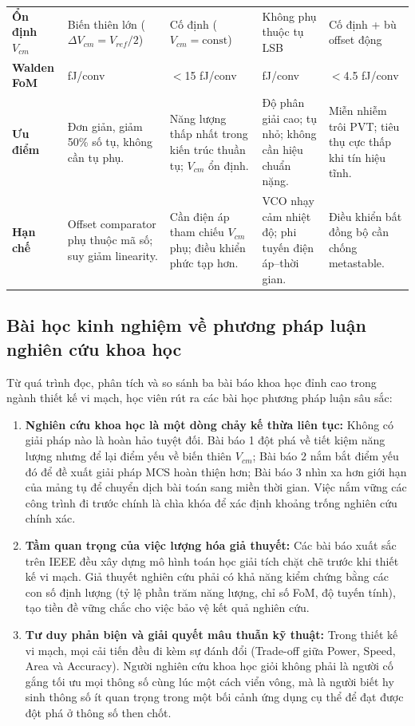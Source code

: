 \documentclass[12pt,a4paper]{article}
\begin{document}
\begin{table}[H]
\begin{tabularx}{\textwidth}{>{\RaggedRight}p{2.1cm} >{\RaggedRight}p{3.0cm} >{\RaggedRight}p{3.0cm} >{\RaggedRight}p{3.0cm} >{\RaggedRight}X}
\addlinespace
\textbf{Ổn định $V_{cm}$} & Biến thiên lớn ($\Delta V_{cm} = V_{ref}/2$) & Cố định ($V_{cm} = \text{const}$) & Không phụ thuộc tụ LSB & Cố định + bù offset động \\
\addlinespace
\textbf{Walden FoM} & 25.5 fJ/conv & $<$15 fJ/conv & 6.0 fJ/conv & $<$4.5 fJ/conv \\
\addlinespace
\textbf{Ưu điểm} & Đơn giản, giảm 50\% số tụ, không cần tụ phụ. & Năng lượng thấp nhất trong kiến trúc thuần tụ; $V_{cm}$ ổn định. & Độ phân giải cao; tụ nhỏ; không cần hiệu chuẩn nặng. & Miễn nhiễm trôi PVT; tiêu thụ cực thấp khi tín hiệu tĩnh. \\
\addlinespace
\textbf{Hạn chế} & Offset comparator phụ thuộc mã số; suy giảm linearity. & Cần điện áp tham chiếu $V_{cm}$ phụ; điều khiển phức tạp hơn. & VCO nhạy cảm nhiệt độ; phi tuyến điện áp--thời gian. & Điều khiển bất đồng bộ cần chống metastable. \\
\bottomrule
\end{tabularx}
\end{table}

\subsection{Bài học kinh nghiệm về phương pháp luận nghiên cứu khoa học}
Từ quá trình đọc, phân tích và so sánh ba bài báo khoa học đỉnh cao trong ngành thiết kế vi mạch, học viên rút ra các bài học phương pháp luận sâu sắc:
\begin{enumerate}
    \item \textbf{Nghiên cứu khoa học là một dòng chảy kế thừa liên tục:} Không có giải pháp nào là hoàn hảo tuyệt đối. Bài báo 1 đột phá về tiết kiệm năng lượng nhưng để lại điểm yếu về biến thiên $V_{cm}$; Bài báo 2 nắm bắt điểm yếu đó để đề xuất giải pháp MCS hoàn thiện hơn; Bài báo 3 nhìn xa hơn giới hạn của mảng tụ để chuyển dịch bài toán sang miền thời gian. Việc nắm vững các công trình đi trước chính là chìa khóa để xác định khoảng trống nghiên cứu chính xác.
    \item \textbf{Tầm quan trọng của việc lượng hóa giả thuyết:} Các bài báo xuất sắc trên IEEE đều xây dựng mô hình toán học giải tích chặt chẽ trước khi thiết kế vi mạch. Giả thuyết nghiên cứu phải có khả năng kiểm chứng bằng các con số định lượng (tỷ lệ phần trăm năng lượng, chỉ số FoM, độ tuyến tính), tạo tiền đề vững chắc cho việc bảo vệ kết quả nghiên cứu.
    \item \textbf{Tư duy phản biện và giải quyết mâu thuẫn kỹ thuật:} Trong thiết kế vi mạch, mọi cải tiến đều đi kèm sự đánh đổi (Trade-off giữa Power, Speed, Area và Accuracy). Người nghiên cứu khoa học giỏi không phải là người cố gắng tối ưu mọi thông số cùng lúc một cách viển vông, mà là người biết hy sinh thông số ít quan trọng trong một bối cảnh ứng dụng cụ thể để đạt được đột phá ở thông số then chốt.
\end{enumerate}
\end{document}
